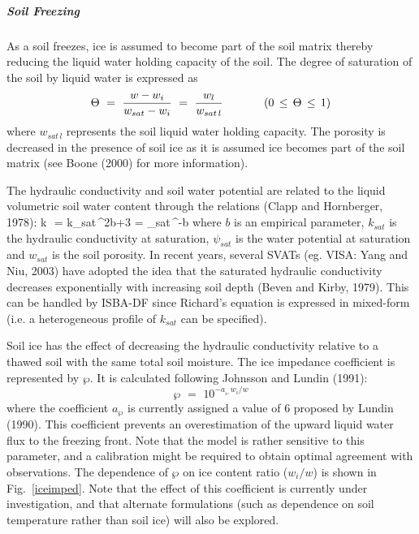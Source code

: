 \subparagraph{Soil Freezing}
%
As a soil freezes, ice is assumed to become part
of the soil matrix thereby reducing the liquid water 
holding capacity of the soil. The degree of saturation
of the soil by liquid water is expressed 
as
%
%
\begin{equation}
\label{srl}
\Theta \,\,=\,\, \frac{w-w_i}{w_{sat}-w_i}
\,\,=\,\, \frac{w_l}{w_{sat\,l}}
\hskip.5in (0\,\leq\, \Theta \,\leq\, 1)
\end{equation}
%
%
where $w_{sat\,l}$ represents the soil liquid water
holding capacity. The porosity is decreased in the presence of
soil ice as it is assumed ice becomes part of the soil matrix
(see Boone \etal (2000) for more information).

The hydraulic conductivity and soil water potential
are related to the liquid volumetric soil water content
through the relations (Clapp and Hornberger, 1978):
%
\beq\label{k}
 k \,\,=\,\,k_{sat}\,{\Theta}^{2b+3} 
\eeq
%
\beq\label{psi}
 \psi =\,\,\psi_{sat}\,{\Theta}^{-b} 
\eeq
%
where $b$ is an empirical parameter, $k_{sat}$ is the 
hydraulic conductivity at saturation, $\psi_{sat}$ is
the water potential at saturation and $w_{sat}$ is the soil
porosity. 
In recent years, several SVATs (eg. VISA: Yang and Niu, 2003\nocite{Yang2003})
have adopted the idea
that the saturated hydraulic conductivity decreases
exponentially with increasing soil depth (Beven and Kirby, 1979). 
This can be handled by ISBA-DF since Richard's equation
is expressed in mixed-form (i.e. a heterogeneous profile
of $k_{sat}$ can be specified).

Soil ice has the effect of decreasing the hydraulic
conductivity relative to a thawed soil
with the same total soil moisture.
The ice impedance coefficient is represented by
$\wp$. It is calculated following Johnsson and Lundin (1991):
%
\begin{equation}\label{iceimp}
\wp \,\,=\,\,{10}^{-a_\wp \,w_i/w}
\end{equation}
%
where the coefficient $a_\wp$ is currently assigned a value
of 6 proposed by Lundin (1990)\nocite{Lundin1990}. This coefficient prevents
an overestimation of the upward 
liquid water flux to the freezing front. Note that the model
is rather sensitive to this parameter, and a calibration might
be required to obtain optimal agreement with observations.
The dependence of $\wp$ on ice content ratio ($w_i/w$)
is shown in Fig.~\ref{iceimped}. 
Note that the effect of this 
coefficient is currently under investigation, and that alternate
formulations (such as dependence on soil temperature rather than
soil ice) will also be explored.

